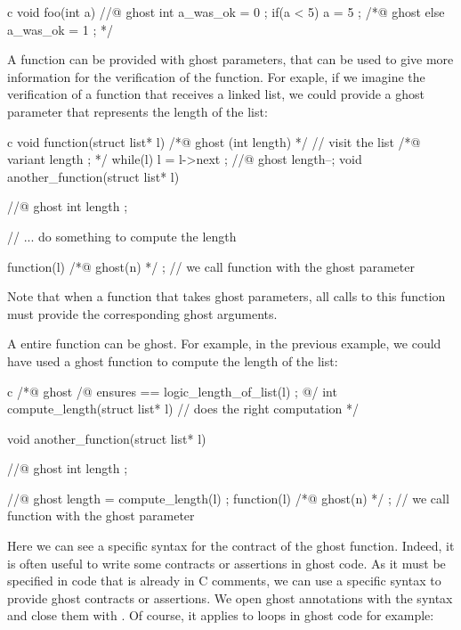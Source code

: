 \begin{CodeBlock}{c}
void foo(int a){
  //@ ghost int a_was_ok = 0 ;
  if(a < 5){
    a = 5 ;
  } /*@ ghost else {
    a_was_ok = 1 ;
  } */
}
\end{CodeBlock}


A function can be provided with ghost parameters, that can be used
to give more information for the verification of the function. For
exaple, if we imagine the verification of a function that receives
a linked list, we could provide a ghost parameter that represents
the length of the list:


\begin{CodeBlock}{c}
void function(struct list* l) /*@ ghost (int length) */ {
  // visit the list
  /*@ variant length ; */
  while(l){
    l = l->next ;
    //@ ghost length--;
  }
}
void another_function(struct list* l){
  //@ ghost int length ;

  // ... do something to compute the length

  function(l) /*@ ghost(n) */ ; // we call function with the ghost parameter
}
\end{CodeBlock}


Note that when a function that takes ghost parameters, all calls to this
function must provide the corresponding ghost arguments.


A entire function can be ghost. For example, in the previous example, we
could have used a ghost function to compute the length of the list:


\begin{CodeBlock}{c}
/*@ ghost
  /@ ensures \result == logic_length_of_list(l) ; @/
  int compute_length(struct list* l){
    // does the right computation
  }
*/

void another_function(struct list* l){
  //@ ghost int length ;

  //@ ghost length = compute_length(l) ;
  function(l) /*@ ghost(n) */ ; // we call function with the ghost parameter
}
\end{CodeBlock}


Here we can see a specific syntax for the contract of the ghost function.
Indeed, it is often useful to write some contracts or assertions in ghost
code. As it must be specified in code that is already in C comments, we
can use a specific syntax to provide ghost contracts or assertions.
We open ghost annotations with the syntax  and close
them with . Of course, it applies to loops in ghost code
for example:


